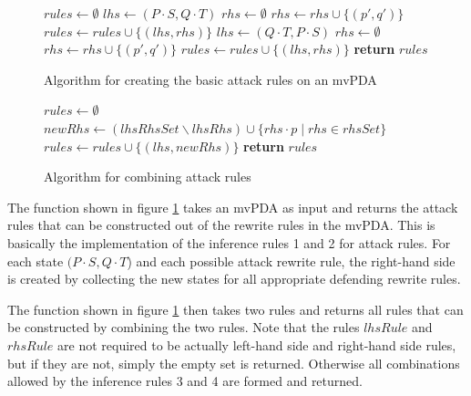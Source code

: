 \begin{figure}[H]
\begin{algorithmic}[1]
  \State $rules ← ∅$
      \State $lhs ← (P⋅S, Q⋅T)$
        \State $rhs ← ∅$
          \State $rhs ← rhs ∪ \{ (p', q') \}$
        \EndFor
        \State $rules ← rules ∪ \{(lhs, rhs)\}$
      \EndFor
      \State $lhs ← (Q⋅T, P⋅S)$
        \State $rhs ← ∅$
          \State $rhs ← rhs ∪ \{ (p', q') \}$
        \EndFor
        \State $rules ← rules ∪ \{(lhs, rhs)\}$
      \EndFor
  \EndFor
  \State \textbf{return} $rules$
\EndFunction
\end{algorithmic}
\caption{Algorithm for creating the basic attack rules on an mvPDA}
\label{alg:make-rules}
\end{figure}

\begin{figure}[H]
\begin{algorithmic}[1]
  \State $rules ← ∅$
      \State $newRhs ← (lhsRhsSet ∖ lhsRhs) ∪ \{ rhs⋅p \mid rhs ∈ rhsSet \}$
      \State $rules ← rules ∪ \{ (lhs, newRhs) \}$
    \EndFor
  \EndIf
  \State \textbf{return} $rules$
\EndFunction
\end{algorithmic}
\caption{Algorithm for combining attack rules}
\label{alg:rule-combining}
\end{figure}

The function {} shown in figure \ref{alg:make-rules}
takes an mvPDA as input and returns the attack rules
that can be constructed out of the rewrite rules in the mvPDA.
This is basically the implementation of the inference rules 1 and 2
for attack rules. For each state $(P⋅S,Q⋅T$) and each possible attack rewrite rule,
the right-hand side is created by collecting the new states for all appropriate
defending rewrite rules.

The function {} shown in figure \ref{alg:make-rules}
then takes two rules and returns all rules that can be constructed by
combining the two rules.
Note that the rules $lhsRule$ and $rhsRule$ are not required to
be actually left-hand side and right-hand side rules, but if they are
not, simply the empty set is returned.
Otherwise all combinations allowed by the inference rules 3 and 4
are formed and returned.

